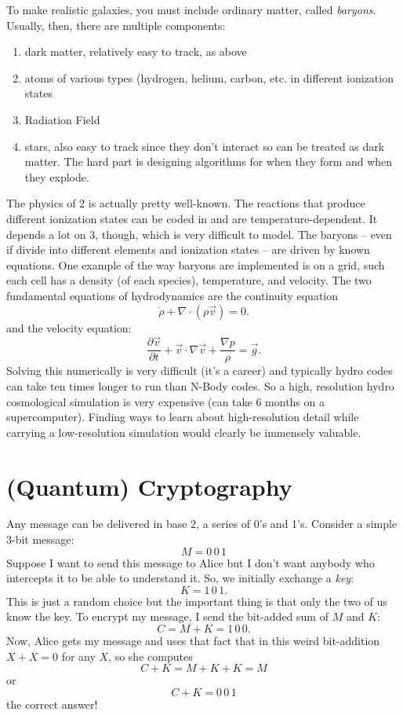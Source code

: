 \documentclass[prd,amsmath,aps,floats,amssymb, floatfix,
  superscriptaddress,nofootinbib]{revtex4-1}
\numberwithin{equation}{section}
\newcommand\be{\begin{equation}}
\newcommand\ee{\end{equation}}
\newcommand\bee{\begin{enumerate}}
\newcommand\eee{\end{enumerate}}
\begin{document}
To make realistic galaxies, you must include ordinary matter, called {\it baryons}. Usually, then, there are multiple components:
\bee
\item dark matter, relatively easy to track, as above
\item atoms of various types (hydrogen, helium, carbon, etc. in different ionization states
\item Radiation Field
\item stars, also easy to track since they don't interact so can be treated as dark matter. The hard part is designing algorithms for when they form and when they explode.
\eee
The physics of 2 is actually pretty well-known. The reactions that produce different ionization states can be coded in and are temperature-dependent. It depends a lot on 3, though, which is very difficult to model. The baryons -- even if divide into different elements and ionization states -- are driven by known equations. One example of the way baryons are implemented is on a grid, such each cell has a density (of each species), temperature, and velocity. The two fundamental equations of hydrodynamics are the continuity equation 
\be
\dot\rho + \nabla\cdot(\rho\vec v) = 0.
\ee
and the velocity equation:
\be
\frac{\partial\vec v}{\partial t} + \vec v\cdot\nabla \vec v + \frac{\nabla p}{\rho} = \vec g
.\ee
Solving this numerically is very difficult (it's a career) and typically hydro codes can take ten times longer to run than N-Body codes. So a high, resolution hydro cosmological simulation is very expensive (can take 6 months on a supercomputer). Finding ways to learn about high-resolution detail while carrying a low-resolution simulation would clearly be immensely valuable.


\section{(Quantum) Cryptography}

Any message can be delivered in base 2, a series of 0's and 1's. Consider a simple 3-bit message:
\be
M = 0\,0\, 1
\ee
Suppose I want to send this message to Alice but I don't want anybody who intercepts it to be able to understand it. So, we initially exchange a {\it key}:
\be
K = 1\, 0\, 1
.\ee
This is just a random choice but the important thing is that only the two of us know the key. To encrypt my message, I send the bit-added sum of $M$ and $K$:
\be
C = M+K = 1\, 0\, 0
.\ee
Now, Alice gets my message and uses that fact that in this weird bit-addition $X+X=0$ for any $X$, so she computes
\be
C+K = M+ K+K = M
\ee
or
\be
C+K = 0\, 0\,1
\ee
the correct answer!
\end{document}
